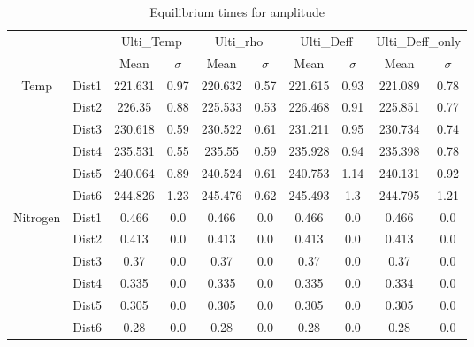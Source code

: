 \begin{table}[h]
\centering
\caption{Equilibrium times for amplitude}
\label{table:5}
\begin{tabular}{cccccccccc}
\toprule
 &  & \multicolumn{2}{c}{Ulti_Temp} & \multicolumn{2}{c}{Ulti_rho} & \multicolumn{2}{c}{Ulti_Deff} & \multicolumn{2}{c}{Ulti_Deff_only} \\
 &  & Mean & $\sigma$ & Mean & $\sigma$ & Mean & $\sigma$ & Mean & $\sigma$ \\
\midrule
\multirow[c]{6}{*}{Temp} & Dist1 & 221.631 & 0.97 & 220.632 & 0.57 & 221.615 & 0.93 & 221.089 & 0.78 \\
 & Dist2 & 226.35 & 0.88 & 225.533 & 0.53 & 226.468 & 0.91 & 225.851 & 0.77 \\
 & Dist3 & 230.618 & 0.59 & 230.522 & 0.61 & 231.211 & 0.95 & 230.734 & 0.74 \\
 & Dist4 & 235.531 & 0.55 & 235.55 & 0.59 & 235.928 & 0.94 & 235.398 & 0.78 \\
 & Dist5 & 240.064 & 0.89 & 240.524 & 0.61 & 240.753 & 1.14 & 240.131 & 0.92 \\
 & Dist6 & 244.826 & 1.23 & 245.476 & 0.62 & 245.493 & 1.3 & 244.795 & 1.21 \\
\multirow[c]{6}{*}{Nitrogen} & Dist1 & 0.466 & 0.0 & 0.466 & 0.0 & 0.466 & 0.0 & 0.466 & 0.0 \\
 & Dist2 & 0.413 & 0.0 & 0.413 & 0.0 & 0.413 & 0.0 & 0.413 & 0.0 \\
 & Dist3 & 0.37 & 0.0 & 0.37 & 0.0 & 0.37 & 0.0 & 0.37 & 0.0 \\
 & Dist4 & 0.335 & 0.0 & 0.335 & 0.0 & 0.335 & 0.0 & 0.334 & 0.0 \\
 & Dist5 & 0.305 & 0.0 & 0.305 & 0.0 & 0.305 & 0.0 & 0.305 & 0.0 \\
 & Dist6 & 0.28 & 0.0 & 0.28 & 0.0 & 0.28 & 0.0 & 0.28 & 0.0 \\
\bottomrule
\end{tabular}
\end{table}
